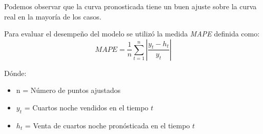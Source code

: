 Podemos observar que la curva pronosticada tiene un buen ajuste sobre la curva real en la mayoría de los casos.

Para evaluar el desempeño del modelo se utilizó la medida \emph{MAPE} definida como: $$MAPE=\frac{1}{n}\sum_{t=1}^{n}|\frac{y_t-h_t}{y_t}|$$

Dónde:
\begin{itemize}[noitemsep]
  \item n = Número de puntos ajustados
  \item $y_t$ = Cuartos noche vendidos en el tiempo $t$
  \item $h_t$ = Venta de cuartos noche pronósticada en el tiempo $t$
\end{itemize}






